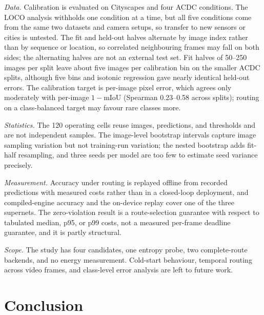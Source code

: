 \documentclass[a4paper,5p]{elsarticle}
\newcommand{\miou}{mIoU}
\begin{document}
\emph{Data.} Calibration is evaluated on Cityscapes and four ACDC conditions. The LOCO analysis withholds one condition at a time, but all five conditions come from the same two datasets and camera setups, so transfer to new sensors or cities is untested. The fit and held-out halves alternate by image index rather than by sequence or location, so correlated neighbouring frames may fall on both sides; the alternating halves are not an external test set. Fit halves of 50--250 images per split leave about five images per calibration bin on the smaller ACDC splits, although five bins and isotonic regression gave nearly identical held-out errors. The calibration target is per-image pixel error, which agrees only moderately with per-image $1-$\miou{} (Spearman 0.23--0.58 across splits); routing on a class-balanced target may favour rare classes more.

\emph{Statistics.} The 120 operating cells reuse images, predictions, and thresholds and are not independent samples. The image-level bootstrap intervals capture image sampling variation but not training-run variation; the nested bootstrap adds fit-half resampling, and three seeds per model are too few to estimate seed variance precisely.

\emph{Measurement.} Accuracy under routing is replayed offline from recorded predictions with measured costs rather than in a closed-loop deployment, and compiled-engine accuracy and the on-device replay cover one of the three supernets. The zero-violation result is a route-selection guarantee with respect to tabulated median, p95, or p99 costs, not a measured per-frame deadline guarantee, and it is partly structural.

\emph{Scope.} The study has four candidates, one entropy probe, two complete-route backends, and no energy measurement. Cold-start behaviour, temporal routing across video frames, and class-level error analysis are left to future work.

\section{Conclusion}
\label{sec:conclusion}
\end{document}
